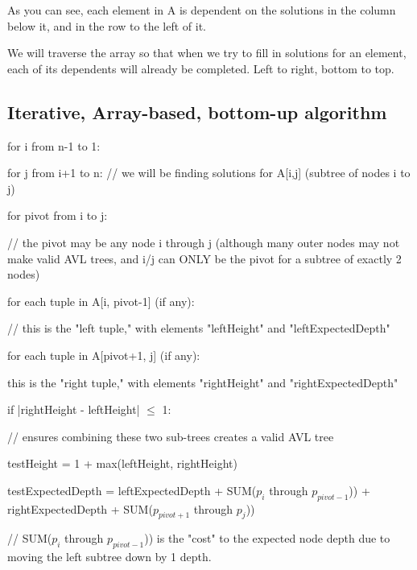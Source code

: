 \documentclass[a4paper]{article}
\begin{document}
As you can see, each element in A is dependent on the solutions in the column below it, and in the row to the left of it.

We will traverse the array so that when we try to fill in solutions for an element, each of its dependents will already be completed. Left to right, bottom to top.

\subsection{Iterative, Array-based, bottom-up algorithm}
\begin{myEnumerate}
\item for i from n-1 to 1:
\begin{myEnumerate}
\item for j from i+1 to n: // we will be finding solutions for A[i,j] (subtree of nodes i to j)
\begin{myEnumerate}
\item for pivot from i to j:
    \begin{myEnumerate}
    \item // the pivot may be any node i through j (although many outer nodes may not make valid AVL trees, and i/j can ONLY be the pivot for a subtree of exactly 2 nodes)
    \item for each tuple in A[i, pivot-1] (if any):
        \begin{myEnumerate}
        \item // this is the "left tuple," with elements "leftHeight" and "leftExpectedDepth"
        \item for each tuple in A[pivot+1, j] (if any):
            \begin{myEnumerate}
            \item this is the "right tuple," with elements "rightHeight" and "rightExpectedDepth"
            \item if |rightHeight - leftHeight| $\leq$ 1: 
                \begin{myEnumerate}
                \item // ensures combining these two sub-trees creates a valid AVL tree
                \item testHeight = 1 + max(leftHeight, rightHeight)
                \item testExpectedDepth = leftExpectedDepth + SUM($p_i$ through $p_{pivot-1}$)) + rightExpectedDepth + SUM($p_{pivot+1}$ through $p_{j}$))
                \item // SUM($p_i$ through $p_{pivot-1}$)) is the "cost" to the expected node depth due to moving the left subtree down by 1 depth.

\end{myEnumerate}
\end{myEnumerate}
\end{myEnumerate}
\end{myEnumerate}
\end{myEnumerate}
\end{myEnumerate}
\end{myEnumerate}
\end{document}
